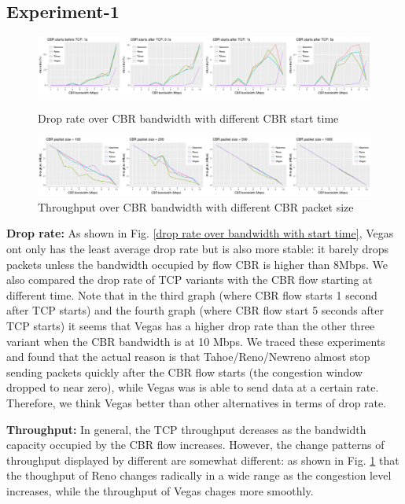 \documentclass[USenglish,oneside,twocolumn]{article}
\begin{document}
\subsection{Experiment-1}
\begin{figure}
	\centering
	\includegraphics[width=\linewidth]{fig/experiment1/drop_rate.pdf}
	\captionsetup{justification=centering}
	\caption{Drop rate over CBR bandwidth with different CBR start time}
	\label{drop rate over bandwidth with start time}
	
	
	
	\includegraphics[width=\linewidth]{fig/experiment1/throughput.pdf}
	\captionsetup{justification=centering}
	\caption{Throughput over CBR bandwidth with different CBR packet size}
	\label{throughput over bandwidth with packet size}
\end{figure}

\noindent \textbf{Drop rate:}
As shown in Fig. \ref{drop rate over bandwidth with start time}, Vegas ont only has the least average drop rate but is also more stable: it barely drops packets unless the bandwidth occupied by flow CBR is higher than 8Mbps. We also compared the drop rate of TCP variants with the CBR flow starting at different time. Note that in the third graph (where CBR flow starts 1 second after TCP starts) and the fourth graph (where CBR flow start 5 seconds after TCP starts) it seems that Vegas has a higher drop rate than the other three variant when the CBR bandwidth is at 10 Mbps. We traced these experiments and found that the actual reason is that Tahoe/Reno/Newreno almost stop sending packets quickly after the CBR flow starts (the congestion window dropped to near zero), while Vegas was is able to send data at a certain rate. Therefore, we think Vegas better than other alternatives in terms of drop rate.

\noindent \textbf{Throughput:} In general, the TCP throughput dcreases as the bandwidth capacity occupied by the CBR flow increases. However, the change patterns of throughput displayed by different are somewhat different: as shown in Fig. \ref{throughput over bandwidth with packet size} that the thoughput of Reno changes radically in a wide range as the congestion level increases, while the throughput of Vegas chages more smoothly. 
\end{document}
